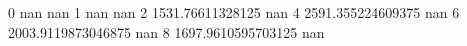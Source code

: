 0 nan nan
1 nan nan
2 1531.76611328125 nan
4 2591.355224609375 nan
6 2003.9119873046875 nan
8 1697.9610595703125 nan
